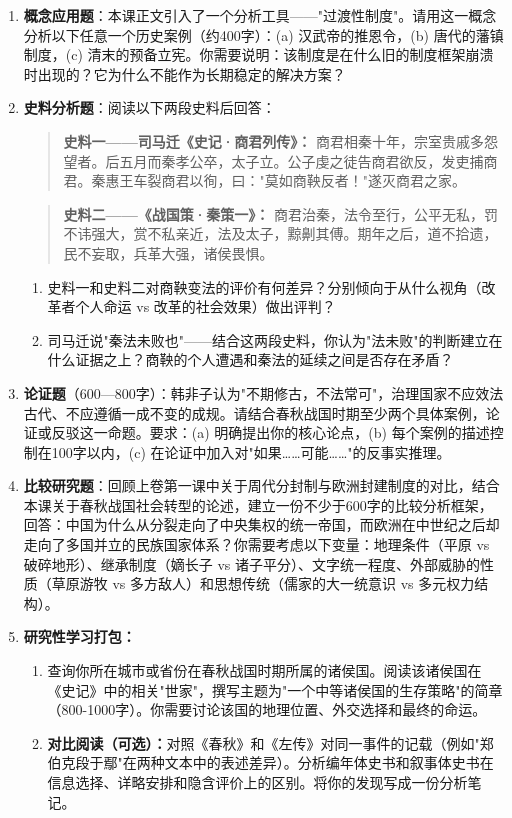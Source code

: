 \documentclass[a4paper,12pt]{ctexart}
\begin{document}
\begin{enumerate}[label=B\arabic*.]
  \item \textbf{概念应用题}：本课正文引入了一个分析工具——"过渡性制度"。请用这一概念分析以下任意一个历史案例（约400字）：(a) 汉武帝的推恩令，(b) 唐代的藩镇制度，(c) 清末的预备立宪。你需要说明：该制度是在什么旧的制度框架崩溃时出现的？它为什么不能作为长期稳定的解决方案？

  \item \textbf{史料分析题}：阅读以下两段史料后回答：
  \begin{quote}
    \textbf{史料一——司马迁《史记·商君列传》：} 商君相秦十年，宗室贵戚多怨望者。后五月而秦孝公卒，太子立。公子虔之徒告商君欲反，发吏捕商君。秦惠王车裂商君以徇，曰："莫如商鞅反者！"遂灭商君之家。
  \end{quote}
  \begin{quote}
    \textbf{史料二——《战国策·秦策一》：} 商君治秦，法令至行，公平无私，罚不讳强大，赏不私亲近，法及太子，黥劓其傅。期年之后，道不拾遗，民不妄取，兵革大强，诸侯畏惧。
  \end{quote}
  \begin{enumerate}[label=(\alph*)]
    \item 史料一和史料二对商鞅变法的评价有何差异？分别倾向于从什么视角（改革者个人命运 vs 改革的社会效果）做出评判？
    \item 司马迁说"秦法未败也"——结合这两段史料，你认为"法未败"的判断建立在什么证据之上？商鞅的个人遭遇和秦法的延续之间是否存在矛盾？
  \end{enumerate}

  \item \textbf{论证题}（600—800字）：韩非子认为"不期修古，不法常可"，治理国家不应效法古代、不应遵循一成不变的成规。请结合春秋战国时期至少两个具体案例，论证或反驳这一命题。要求：(a) 明确提出你的核心论点，(b) 每个案例的描述控制在100字以内，(c) 在论证中加入对"如果……可能……"的反事实推理。

  \item \textbf{比较研究题}：回顾上卷第一课中关于周代分封制与欧洲封建制度的对比，结合本课关于春秋战国社会转型的论述，建立一份不少于600字的比较分析框架，回答：中国为什么从分裂走向了中央集权的统一帝国，而欧洲在中世纪之后却走向了多国并立的民族国家体系？你需要考虑以下变量：地理条件（平原 vs 破碎地形）、继承制度（嫡长子 vs 诸子平分）、文字统一程度、外部威胁的性质（草原游牧 vs 多方敌人）和思想传统（儒家的大一统意识 vs 多元权力结构）。
  \item \textbf{研究性学习打包：}
  \begin{enumerate}[label=(\alph*)]
    \item 查询你所在城市或省份在春秋战国时期所属的诸侯国。阅读该诸侯国在《史记》中的相关"世家"，撰写主题为"一个中等诸侯国的生存策略"的简章（800-1000字）。你需要讨论该国的地理位置、外交选择和最终的命运。
    \item \textbf{对比阅读（可选）：}对照《春秋》和《左传》对同一事件的记载（例如"郑伯克段于鄢"在两种文本中的表述差异）。分析编年体史书和叙事体史书在信息选择、详略安排和隐含评价上的区别。将你的发现写成一份分析笔记。
  \end{enumerate}
\end{enumerate}
\end{document}
